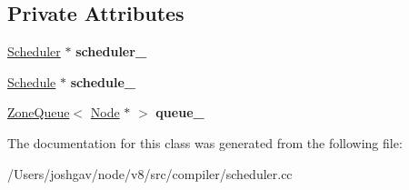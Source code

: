 \subsection*{Private Attributes}
\begin{DoxyCompactItemize}
\item 
\hyperlink{classv8_1_1internal_1_1compiler_1_1_scheduler}{Scheduler} $\ast$ {\bfseries scheduler\+\_\+}\hypertarget{classv8_1_1internal_1_1compiler_1_1_schedule_early_node_visitor_ab452099e4c3783b40da072c3ef60d9d6}{}\label{classv8_1_1internal_1_1compiler_1_1_schedule_early_node_visitor_ab452099e4c3783b40da072c3ef60d9d6}

\item 
\hyperlink{classv8_1_1internal_1_1compiler_1_1_schedule}{Schedule} $\ast$ {\bfseries schedule\+\_\+}\hypertarget{classv8_1_1internal_1_1compiler_1_1_schedule_early_node_visitor_ab5b9417e7fb71c4d3f855f10f9b2dd14}{}\label{classv8_1_1internal_1_1compiler_1_1_schedule_early_node_visitor_ab5b9417e7fb71c4d3f855f10f9b2dd14}

\item 
\hyperlink{classv8_1_1internal_1_1_zone_queue}{Zone\+Queue}$<$ \hyperlink{classv8_1_1internal_1_1compiler_1_1_node}{Node} $\ast$ $>$ {\bfseries queue\+\_\+}\hypertarget{classv8_1_1internal_1_1compiler_1_1_schedule_early_node_visitor_a245e1198e9980c45c12a13dcd7d43e3e}{}\label{classv8_1_1internal_1_1compiler_1_1_schedule_early_node_visitor_a245e1198e9980c45c12a13dcd7d43e3e}

\end{DoxyCompactItemize}


The documentation for this class was generated from the following file\+:\begin{DoxyCompactItemize}
\item 
/\+Users/joshgav/node/v8/src/compiler/scheduler.\+cc\end{DoxyCompactItemize}
